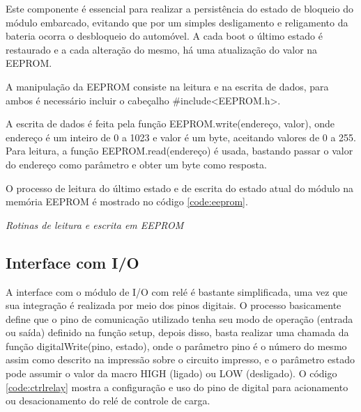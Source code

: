 Este componente é essencial para realizar a persistência do estado de bloqueio do módulo embarcado, evitando que por um simples desligamento e religamento da bateria ocorra o desbloqueio do automóvel. A cada boot o último estado é restaurado e a cada alteração do mesmo, há uma atualização do valor na EEPROM.

A manipulação da EEPROM consiste na leitura e na escrita de dados, para ambos é necessário incluir o cabeçalho \#include<EEPROM.h>. 

A escrita de dados é feita pela função EEPROM.write(endereço, valor), onde endereço é um inteiro de 0 a 1023 e valor é um byte, aceitando valores de 0 a 255. Para leitura, a função EEPROM.read(endereço) é usada, bastando passar o valor do endereço como parâmetro e obter um byte como resposta.

O processo de leitura do último estado e de escrita do estado atual do módulo na memória EEPROM é mostrado no código \ref{code:eeprom}.

\renewcommand{\baselinestretch}{0.5}  %
\begin{codigo}[htb]
\fontsize{9pt}{9pt}\selectfont
      \begin{boxit}  %
      \vspace{2mm}
   \end{boxit}
   \caption{\it Rotinas de leitura e escrita em EEPROM}
   \label{code:eeprom}
\end{codigo}

\newpage

\subsection{Interface com I/O}

A interface com o módulo de I/O com relé é bastante simplificada, uma vez que sua integração é realizada por meio dos pinos digitais. O processo basicamente define que o pino de comunicação utilizado tenha seu modo de operação (entrada ou saída) definido na função setup, depois disso, basta realizar uma chamada da função digitalWrite(pino, estado), onde o parâmetro pino é o número do mesmo assim como descrito na impressão sobre o circuito impresso, e o parâmetro estado pode assumir o valor da macro HIGH (ligado) ou LOW (desligado). O código \ref{code:ctrlrelay} mostra a configuração e uso do pino de digital para acionamento ou desacionamento do relé de controle de carga.

